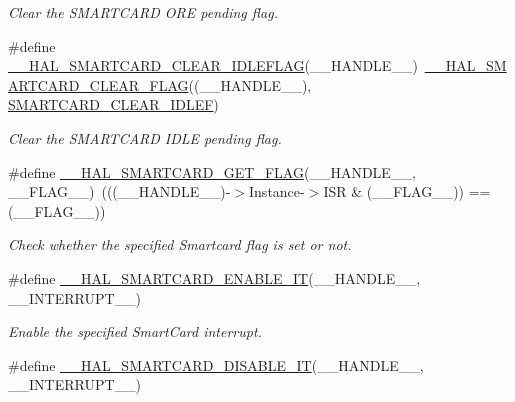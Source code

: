 \begin{DoxyCompactItemize}
\begin{DoxyCompactList}\small\item\em Clear the S\+M\+A\+R\+T\+C\+A\+RD O\+RE pending flag. \end{DoxyCompactList}\item 
\#define \hyperlink{group___s_m_a_r_t_c_a_r_d___exported___macros_ga20777f06c3aaad7872cd3d655f021f45}{\+\_\+\+\_\+\+H\+A\+L\+\_\+\+S\+M\+A\+R\+T\+C\+A\+R\+D\+\_\+\+C\+L\+E\+A\+R\+\_\+\+I\+D\+L\+E\+F\+L\+AG}(\+\_\+\+\_\+\+H\+A\+N\+D\+L\+E\+\_\+\+\_\+)~\hyperlink{group___s_m_a_r_t_c_a_r_d___exported___macros_gab40a9ea5252be0340f074b1cab9c2264}{\+\_\+\+\_\+\+H\+A\+L\+\_\+\+S\+M\+A\+R\+T\+C\+A\+R\+D\+\_\+\+C\+L\+E\+A\+R\+\_\+\+F\+L\+AG}((\+\_\+\+\_\+\+H\+A\+N\+D\+L\+E\+\_\+\+\_\+), \hyperlink{group___s_m_a_r_t_c_a_r_d___i_t___c_l_e_a_r___flags_ga2f66ef3a43399ba852140a257472f3a1}{S\+M\+A\+R\+T\+C\+A\+R\+D\+\_\+\+C\+L\+E\+A\+R\+\_\+\+I\+D\+L\+EF})
\begin{DoxyCompactList}\small\item\em Clear the S\+M\+A\+R\+T\+C\+A\+RD I\+D\+LE pending flag. \end{DoxyCompactList}\item 
\#define \hyperlink{group___s_m_a_r_t_c_a_r_d___exported___macros_ga38f995afc135ddbaafc0c68e12c31f11}{\+\_\+\+\_\+\+H\+A\+L\+\_\+\+S\+M\+A\+R\+T\+C\+A\+R\+D\+\_\+\+G\+E\+T\+\_\+\+F\+L\+AG}(\+\_\+\+\_\+\+H\+A\+N\+D\+L\+E\+\_\+\+\_\+,  \+\_\+\+\_\+\+F\+L\+A\+G\+\_\+\+\_\+)~(((\+\_\+\+\_\+\+H\+A\+N\+D\+L\+E\+\_\+\+\_\+)-\/$>$Instance-\/$>$I\+SR \& (\+\_\+\+\_\+\+F\+L\+A\+G\+\_\+\+\_\+)) == (\+\_\+\+\_\+\+F\+L\+A\+G\+\_\+\+\_\+))
\begin{DoxyCompactList}\small\item\em Check whether the specified Smartcard flag is set or not. \end{DoxyCompactList}\item 
\#define \hyperlink{group___s_m_a_r_t_c_a_r_d___exported___macros_gaa80e83666a04249e0c7ca26d036a0d3b}{\+\_\+\+\_\+\+H\+A\+L\+\_\+\+S\+M\+A\+R\+T\+C\+A\+R\+D\+\_\+\+E\+N\+A\+B\+L\+E\+\_\+\+IT}(\+\_\+\+\_\+\+H\+A\+N\+D\+L\+E\+\_\+\+\_\+,  \+\_\+\+\_\+\+I\+N\+T\+E\+R\+R\+U\+P\+T\+\_\+\+\_\+)
\begin{DoxyCompactList}\small\item\em Enable the specified Smart\+Card interrupt. \end{DoxyCompactList}\item 
\#define \hyperlink{group___s_m_a_r_t_c_a_r_d___exported___macros_gaa85d69ff6a1a3bd9d00bdfb35122375d}{\+\_\+\+\_\+\+H\+A\+L\+\_\+\+S\+M\+A\+R\+T\+C\+A\+R\+D\+\_\+\+D\+I\+S\+A\+B\+L\+E\+\_\+\+IT}(\+\_\+\+\_\+\+H\+A\+N\+D\+L\+E\+\_\+\+\_\+,  \+\_\+\+\_\+\+I\+N\+T\+E\+R\+R\+U\+P\+T\+\_\+\+\_\+)

\end{DoxyCompactItemize}
